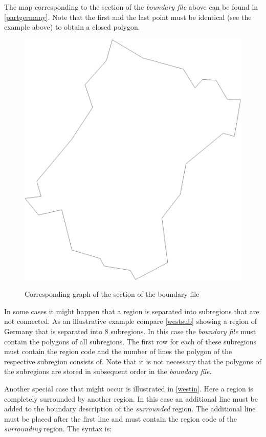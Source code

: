 The  map corresponding to the section of the {\em boundary file}
above can be found in \autoref{partgermany}. Note that the first
and the last point must be identical (see the example above) to
obtain a closed polygon.


\begin{figure}[ht]
\centering
\includegraphics [scale=0.3]{grafiken/westpart.eps}
{\em\caption{\label{partgermany} Corresponding graph of the
section of the boundary file}}
\end{figure}

In some cases it might happen that a region is separated into
subregions that are not connected. As an illustrative example
compare \autoref{westsub} showing a region of Germany that is
separated into 8 subregions. In this case the {\em boundary file}
must contain the polygons of all subregions. The first row for
each of these subregions must contain the region code and the
number of lines the polygon of the respective subregion consists
of. Note that it is not necessary that the polygons of the
subregions are stored in subsequent order in the {\em boundary
file}.

Another special case that might occur is illustrated in
\autoref{westin}. Here a region is completely surrounded by
another region. In this case an additional line must be added to
the boundary description of the {\em surrounded} region. The
additional line must be placed  after the first line and must
contain the
region code of the {\em surrounding} region. The syntax is:

